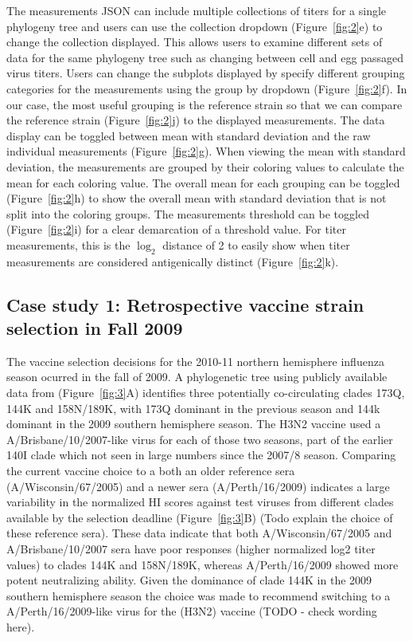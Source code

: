 \documentclass[utf8]{FrontiersinHarvard} %
\begin{document}
The measurements JSON can include multiple collections of titers for a single phylogeny tree and users can use the collection dropdown (Figure~\ref{fig:2}e) to change the collection displayed.
This allows users to examine different sets of data for the same phylogeny tree such as changing between cell and egg passaged virus titers.
Users can change the subplots displayed by specify different grouping categories for the measurements using the group by dropdown (Figure~\ref{fig:2}f).
In our case, the most useful grouping is the reference strain so that we can compare the reference strain (Figure~\ref{fig:2}j) to the displayed measurements.
The data display can be toggled between mean with standard deviation and the raw individual measurements (Figure~\ref{fig:2}g).
When viewing the mean with standard deviation, the measurements are grouped by their coloring values to calculate the mean for each coloring value.
The overall mean for each grouping can be toggled (Figure~\ref{fig:2}h) to show the overall mean with standard deviation that is not split into the coloring groups.
The measurements threshold can be toggled (Figure~\ref{fig:2}i) for a clear demarcation of a threshold value.
For titer measurements, this is the $\log_{2}$ distance of 2 to easily show when titer measurements are considered antigenically distinct (Figure~\ref{fig:2}k).

\subsection{Case study 1: Retrospective vaccine strain selection in Fall 2009}

The vaccine selection decisions for the 2010-11 northern hemisphere influenza season ocurred in the fall of 2009.
A phylogenetic tree using publicly available data from \citep{Bedford:2014bf} (Figure~\ref{fig:3}A) identifies three potentially co-circulating clades 173Q, 144K and 158N/189K, with 173Q dominant in the previous season and 144k dominant in the 2009 southern hemisphere season.
The H3N2 vaccine used a A/Brisbane/10/2007-like virus for each of those two seasons, part of the earlier 140I clade which not seen in large numbers since the 2007/8 season.
Comparing the current vaccine choice to a both an older reference sera (A/Wisconsin/67/2005) and a newer sera (A/Perth/16/2009) indicates a large variability in the normalized HI scores against test viruses from different clades available by the selection deadline (Figure~\ref{fig:3}B) (Todo explain the choice of these reference sera).
These data indicate that both A/Wisconsin/67/2005 and A/Brisbane/10/2007 sera have poor responses (higher normalized log2 titer values) to clades 144K and 158N/189K, whereas A/Perth/16/2009 showed more potent neutralizing ability.
Given the dominance of clade 144K in the 2009 southern hemisphere season the choice was made to recommend switching to a A/Perth/16/2009-like virus for the (H3N2) vaccine (TODO - check wording here).
\end{document}
